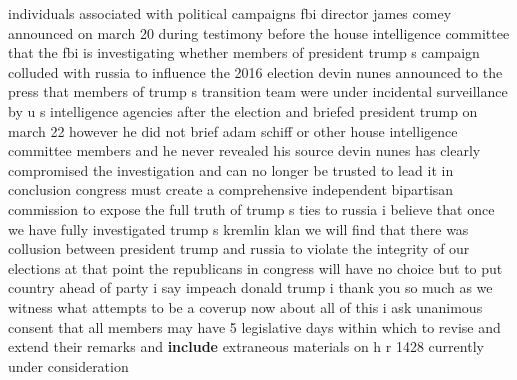 \documentclass{article}
\begin{document}
individuals associated with political campaigns fbi director james comey announced on march 20 during testimony before the house intelligence committee that the fbi is investigating whether members of president trump s campaign colluded with russia to influence the 2016 election devin nunes announced to the press that members of trump s transition team were under incidental surveillance by u s intelligence agencies after the election and briefed president trump on march 22 however he did not brief adam schiff or other house intelligence committee members and he never revealed his source devin nunes has clearly compromised the investigation and can no longer be trusted to lead it in conclusion congress must create a comprehensive independent bipartisan commission to expose the full truth of trump s ties to russia i believe that once we have fully investigated trump s kremlin klan we will find that there was collusion between president trump and russia to violate the integrity of our elections at that point the republicans in congress will have no choice but to put country ahead of party i say impeach donald trump i thank you so much as we witness what attempts to be a coverup now about all of this
\vspace{8mm}
i ask unanimous consent that all members may have 5 legislative days within which to revise and extend their remarks and {\bf \color{red} include} extraneous materials on h r 1428 currently under consideration\pagebreak
\end{document}
